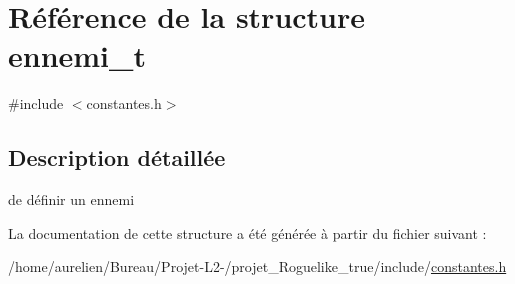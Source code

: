 \hypertarget{structennemi__t}{}\section{Référence de la structure ennemi\+\_\+t}
\label{structennemi__t}


{\ttfamily \#include $<$constantes.\+h$>$}



\subsection{Description détaillée}
de définir un ennemi 

La documentation de cette structure a été générée à partir du fichier suivant \+:\begin{DoxyCompactItemize}
\item 
/home/aurelien/\+Bureau/\+Projet-\/\+L2-\//projet\+\_\+\+Roguelike\+\_\+true/include/\hyperlink{constantes_8h}{constantes.\+h}\end{DoxyCompactItemize}
